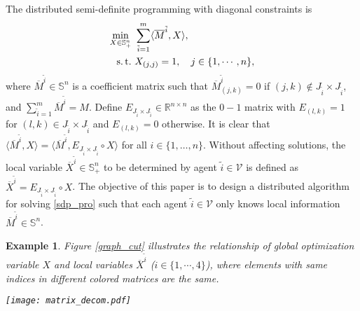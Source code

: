 \documentclass[journal]{IEEEtran}
\newtheorem{example}{Example}[section]
\begin{document}

The distributed semi-definite programming with diagonal constraints  is
\begin{subequations}\label{sdp_pro}
	\begin{align}
	\min_{X\in\mathbb{S}_+^n} \,\, & \sum_{\tilde{i}=1}^m   \langle\overline{M}^{\tilde{i}},  X\rangle, \label{sdp_func}\\
	{\rm s. \, t.}\, \, & X_{(j,j)}=1, \quad j \in \{1,\cdots,n\}, \label{sdp_constr}
	\end{align}
\end{subequations}
where $\overline{M}^{\tilde{i}}\in \mathbb{S}^n$ is a coefficient matrix such that $\overline{M}^{\tilde{i}}_{(j,k)} = 0$ if $(j,k)\notin J_{\tilde{i}}\times J_{\tilde{i}}$, {and $\sum_{\tilde{i}=1}^m \overline{M}^{\tilde{i}}=M$.} 
Define $E_{J_{\tilde{i}}\times J_{\tilde{i}}}\in \mathbb{R}^{n\times n}$ as the $0-1$ matrix with $E_{(l,k)}=1$ for $(l,k) \in J_{\tilde{i}}\times J_{\tilde{i}}$ and $E_{(l,k)}=0$ otherwise. It is clear that $ \langle\overline{M}^{\tilde{i}},  X\rangle =  \langle\overline{M}^{\tilde{i}},  E_{J_{\tilde{i}}\times J_{\tilde{i}}} \circ X\rangle$ for all $i\in\{1,\ldots,n\}$. Without affecting solutions, the local  variable $\overline{X}^{\tilde{i}}\in\mathbb{S}_{+}^{n}$ to be determined by agent $\tilde{i}\in\mathcal V$ is defined as $\overline{X}^{\tilde{i}}=E_{J_{\tilde{i}}\times J_{\tilde{i}}} \circ X$. 
The objective of this paper is to design a distributed algorithm for solving \eqref{sdp_pro} such that each agent $\tilde{i}\in\mathcal V$ only knows local information $\overline{M}^{\tilde{i}}\in \mathbb{S}^n$.

\begin{example}
	Figure \ref{graph_cut} illustrates the  relationship of global optimization variable $X$ and  local variables $\overline{X}^{\tilde{i}}$ ($i\in \{1,\cdots,4\}$), where elements with same indices in different colored matrices are the same.
	\begin{figure*}
		\centering
		\texttt{[image: matrix\_decom.pdf]}
		\caption{Matrix decomposition of global variable $X$ over four agents. }\label{graph_cut}
	\end{figure*}
\end{example}
%
\end{document}
